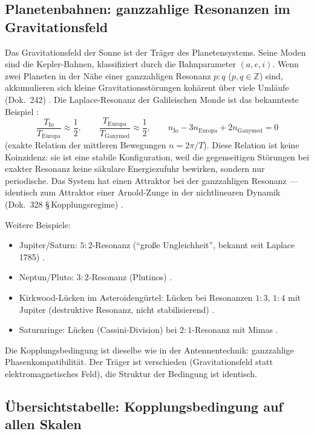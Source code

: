 \subsection*{Planetenbahnen: ganzzahlige Resonanzen im Gravitationsfeld}

Das Gravitationsfeld der Sonne ist der Träger des Planetensystems.
Seine Moden sind die Kepler-Bahnen, klassifiziert durch die
Bahnparameter $(a, e, i)$. Wenn zwei Planeten in der Nähe einer
ganzzahligen Resonanz $p:q$ ($p, q \in \mathbb{Z}$) sind, akkumulieren
sich kleine Gravitationsstörungen kohärent über viele Umläufe
(Dok.~242) \cite{PascherDok242,Murray1999}. Die Laplace-Resonanz der Galileischen Monde ist das
bekannteste Beispiel \cite{Murray1999,Peale1979}:
\[
  \frac{T_\mathrm{Io}}{T_\mathrm{Europa}} \approx \frac{1}{2},
  \qquad
  \frac{T_\mathrm{Europa}}{T_\mathrm{Ganymed}} \approx \frac{1}{2},
  \qquad
  n_\mathrm{Io} - 3n_\mathrm{Europa} + 2n_\mathrm{Ganymed} = 0
\]
(exakte Relation der mittleren Bewegungen $n = 2\pi/T$). Diese
Relation ist keine Koinzidenz: sie ist eine stabile Konfiguration,
weil die gegenseitigen Störungen bei exakter Resonanz keine
säkulare Energiezufuhr bewirken, sondern nur periodische. Das System
hat einen Attraktor bei der ganzzahligen Resonanz --- identisch
zum Attraktor einer Arnold-Zunge in der nichtlinearen Dynamik
(Dok.~328 §\,Kopplungsregime) \KM.

Weitere Beispiele:
\begin{itemize}[nosep]
  \item Jupiter/Saturn: $5:2$-Resonanz (``große Ungleichheit'',
    bekannt seit Laplace 1785) \QM.
  \item Neptun/Pluto: $3:2$-Resonanz (Plutinos) \QM.
  \item Kirkwood-Lücken im Asteroidengürtel: Lücken bei
    Resonanzen $1:3$, $1:4$ mit Jupiter (destruktive Resonanz,
    nicht stabilisierend) \QM.
  \item Saturnringe: Lücken (Cassini-Division) bei $2:1$-Resonanz
    mit Mimas \QM.
\end{itemize}

Die Kopplungsbedingung ist dieselbe wie in der Antennentechnik: ganzzahlige
Phasenkompatibilität. Der Träger ist verschieden (Gravitationsfeld statt
elektromagnetisches Feld), die Struktur der Bedingung ist identisch.

\subsection*{Übersichtstabelle: Kopplungsbedingung auf allen Skalen}

